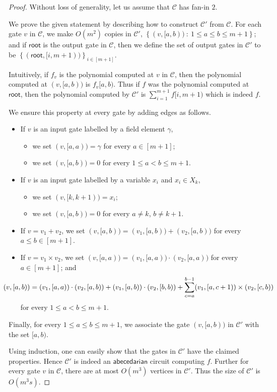 \documentclass[10pt,a4paper]{article}
\def\set#1{\left\{ #1 \right\}}
\def\inbrace#1{\left\{ #1 \right\}}
\def\setdef#1#2{\inbrace{ #1 \ : \ #2}}
\newcommand{\ckt}{\textbf{$\mathcal{C}$}}
\newcommand{\rt}{\mathsf{root}}
\newcommand{\abcd}{\mathsf{abecedarian}}
\begin{document}
\orderCkt*

\begin{proof}
	Without loss of generality, let us assume that $\ckt$ has fan-in $2$.
	
	We prove the given statement by describing how to construct $\ckt'$ from $\ckt$. 	
	For each gate $v$ in $\ckt$, we make $O(m^2)$ copies in $\ckt'$, $\setdef{(v, [a,b))}{1 \leq a \leq b \leq m+1}$; and if $\rt$ is the output gate in $\ckt$, then we define the set of output gates in $\ckt'$ to be $\set{(\rt, [i,m+1))}_{i \in [m+1]}$. 
	
	Intuitively, if $f_v$ is the polynomial computed at $v$ in $\ckt$, then the polynomial computed at $(v, [a,b))$ is $f_v[a,b)$. 
	Thus if $f$ was the polynomial computed at $\rt$, then the polynomial computed by $\ckt'$ is $\sum_{i=1}^{m+1} f[i,m+1)$ which is indeed $f$.
	
	We ensure this property at every gate by adding edges as follows. 	
	\begin{itemize}
		\item If $v$ is an input gate labelled by a field element $\gamma$, 
		\begin{itemize}
			\item we set $(v, [a,a)) = \gamma$ for every $a \in [m+1]$;
			\item we set $(v, [a,b)) = 0$ for every $1 \leq a < b \leq m+1$.
		\end{itemize}
		\item If $v$ is an input gate labelled by a variable $x_i$ and $x_i \in X_k$, 
		\begin{itemize}
			\item we set $(v, [k, k+1)) = x_i$;
			\item we set $(v, [a,b)) = 0$ for every $a \neq k$, $b \neq k+1$.
		\end{itemize} 
		\item If $v = v_1 + v_2$, \qquad we set $(v, [a,b)) = (v_1, [a,b)) + (v_2, [a,b))$ for every $a \leq b \in [m+1]$.
		\item If $v = v_1 \times v_2$, \qquad we set $(v, [a,a)) = (v_1, [a,a)) \cdot (v_2, [a,a))$ for every $a \in [m+1]$; \quad and 
		\[
			\hspace{-2.5em}
			(v, [a,b)) = (v_1, [a,a)) \cdot (v_2, [a,b)) + (v_1, [a,b)) \cdot (v_2, [b,b)) + \sum_{c=a}^{b-1} (v_1, [a, c+1)) \times (v_2, [c, b))
		\]
		for every $1 \leq a < b \leq m+1$.
	\end{itemize}
	\noindent Finally, for every $1 \leq a \leq b \leq m+1$, we associate the gate $(v, [a,b))$ in $\ckt'$ with the set $[a,b)$. 
	
	Using induction, one can easily show that the gates in $\ckt'$ have the claimed properties. Hence $\ckt'$ is indeed an $\abcd$ circuit computing $f$. 
	Further for every gate $v$ in $\ckt$, there are at most $O(m^3)$ vertices in $\ckt'$. Thus the size of $\ckt'$ is $O(m^3 s)$.
\end{proof}
\end{document}
